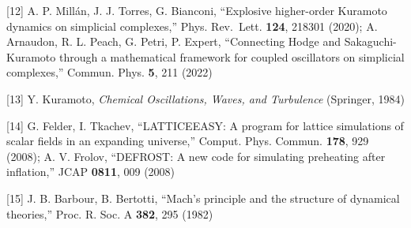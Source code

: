 \documentclass[
  a4paper,
]{ltjsarticle}
\begin{document}
{[}12{]} A. P. Millán, J. J. Torres, G. Bianconi, ``Explosive
higher-order Kuramoto dynamics on simplicial complexes,'' Phys.
Rev.~Lett. \textbf{124}, 218301 (2020); A. Arnaudon, R. L. Peach, G.
Petri, P. Expert, ``Connecting Hodge and Sakaguchi-Kuramoto through a
mathematical framework for coupled oscillators on simplicial
complexes,'' Commun. Phys. \textbf{5}, 211 (2022)

{[}13{]} Y. Kuramoto, \emph{Chemical Oscillations, Waves, and
Turbulence} (Springer, 1984)

{[}14{]} G. Felder, I. Tkachev, ``LATTICEEASY: A program for lattice
simulations of scalar fields in an expanding universe,'' Comput. Phys.
Commun. \textbf{178}, 929 (2008); A. V. Frolov, ``DEFROST: A new code
for simulating preheating after inflation,'' JCAP \textbf{0811}, 009
(2008)

{[}15{]} J. B. Barbour, B. Bertotti, ``Mach's principle and the
structure of dynamical theories,'' Proc. R. Soc. A \textbf{382}, 295
(1982)
\end{document}
